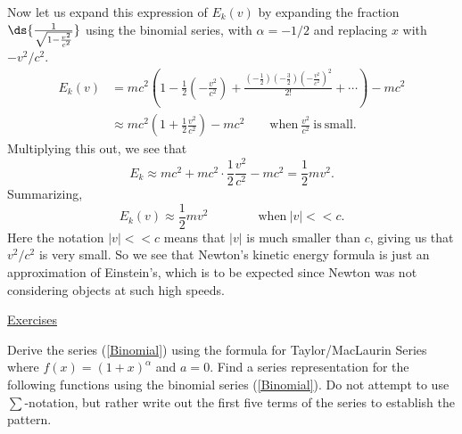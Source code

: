 Now let us expand this expression of $E_k(v)$ by expanding
the fraction $\ds{\frac1{\sqrt{1-\frac{v^2}{c^2}}}}$ using
the binomial series, with $\alpha=-1/2$ and replacing
$x$ with $-v^2/c^2$.
\begin{align}E_k(v)&=mc^2\left(1-\frac12\left(-\frac{v^2}{c^2}\right) 
+\frac{\left(-\frac12\right)\left(-\frac32\right)
\left(-\frac{v^2}{c^2}\right)^2}{2!}+\cdots \right)-mc^2\label{einexpand}\\ 
&\approx mc^2\left(1+\frac12\frac{v^2}{c^2}\right)-mc^2
\qquad \mathrm{when\ } \frac{v^2}{c^2}\ \mathrm{is\ small.}\end{align} 
Multiplying this out, we see that 
\begin{equation}E_k\approx mc^2+mc^2\cdot\frac12\frac{v^2}{c^2}-mc^2
=\frac12mv^2.\end{equation}
Summarizing, 
\begin{equation}E_k(v)\approx\frac12mv^2\qquad\qquad\mathrm{when\ }
|v|<<c.\label{einsumm}\end{equation} 
Here the notation $|v|<<c$ means that $|v|$ is much smaller than $c$,
giving us that $v^2/c^2$ is very small.
So we see that Newton's kinetic energy formula is just an
approximation of Einstein's, which is to be expected since
Newton was not considering objects at such high speeds.  
\eex

\bigskip
\newpage
\begin{center}{\Large\underline{Exercises}}\end{center}
\bigskip
\bhw
Derive the series
(\ref{Binomial}) using the formula for Taylor/MacLaurin
Series where $f(x)=(1+x)^\alpha$ and $a=0$.
\label{BinomialDerivation}\ehw
\bhw Find a series representation for the following functions
using the binomial series (\ref{Binomial}).  Do not attempt
to use $\sum$-notation, but rather write out the first five
terms of the series to establish the pattern. 
 
